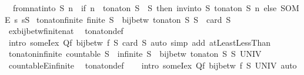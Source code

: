 \begin{isabellebody}
\ \ {\isachardoublequoteopen}from{\isacharunderscore}nat{\isacharunderscore}into\ S\ n\ {\isacharequal}\ {\isacharparenleft}if\ n\ {\isasymin}\ to{\isacharunderscore}nat{\isacharunderscore}on\ S\ {\isacharbackquote}\ S\ then\ inv{\isacharunderscore}into\ S\ {\isacharparenleft}to{\isacharunderscore}nat{\isacharunderscore}on\ S{\isacharparenright}\ n\ else\ SOME\ s{\isachardot}\ s{\isasymin}S{\isacharparenright}{\isachardoublequoteclose}\isanewline
\isanewline
{}\isamarkupfalse%
\ to{\isacharunderscore}nat{\isacharunderscore}on{\isacharunderscore}finite{\isacharcolon}\ {\isachardoublequoteopen}finite\ S\ {\isasymLongrightarrow}\ bij{\isacharunderscore}betw\ {\isacharparenleft}to{\isacharunderscore}nat{\isacharunderscore}on\ S{\isacharparenright}\ S\ {\isacharbraceleft}{\isachardot}{\isachardot}{\isacharless}\ card\ S{\isacharbraceright}{\isachardoublequoteclose}\isanewline
%
\isadelimproof
\ \ %
\endisadelimproof
%
\isatagproof
{}\isamarkupfalse%
\ ex{\isacharunderscore}bij{\isacharunderscore}betw{\isacharunderscore}finite{\isacharunderscore}nat\ \isamarkupfalse%
\ to{\isacharunderscore}nat{\isacharunderscore}on{\isacharunderscore}def\isanewline
\ \ \isamarkupfalse%
\ {\isacharparenleft}intro\ someI{}{\isacharunderscore}ex{\isacharbrackleft}\ Q{\isacharequal}{\isachardoublequoteopen}{\isasymlambda}f{\isachardot}\ bij{\isacharunderscore}betw\ f\ S\ {\isacharbraceleft}{\isachardot}{\isachardot}{\isacharless}card\ S{\isacharbraceright}{\isachardoublequoteclose}{\isacharbrackright}{\isacharparenright}\ {\isacharparenleft}auto\ simp\ add{\isacharcolon}\ atLeast{}LessThan{\isacharparenright}%
\endisatagproof
{\isafoldproof}%
%
\isadelimproof
\isanewline
%
\endisadelimproof
\isanewline
{}\isamarkupfalse%
\ to{\isacharunderscore}nat{\isacharunderscore}on{\isacharunderscore}infinite{\isacharcolon}\ {\isachardoublequoteopen}countable\ S\ {\isasymLongrightarrow}\ infinite\ S\ {\isasymLongrightarrow}\ bij{\isacharunderscore}betw\ {\isacharparenleft}to{\isacharunderscore}nat{\isacharunderscore}on\ S{\isacharparenright}\ S\ UNIV{\isachardoublequoteclose}\isanewline
%
\isadelimproof
\ \ %
\endisadelimproof
%
\isatagproof
{}\isamarkupfalse%
\ countableE{\isacharunderscore}infinite\ \isamarkupfalse%
\ to{\isacharunderscore}nat{\isacharunderscore}on{\isacharunderscore}def\isanewline
\ \ \isamarkupfalse%
\ {\isacharparenleft}intro\ someI{}{\isacharunderscore}ex{\isacharbrackleft}\ Q{\isacharequal}{\isachardoublequoteopen}{\isasymlambda}f{\isachardot}\ bij{\isacharunderscore}betw\ f\ S\ UNIV{\isachardoublequoteclose}{\isacharbrackright}{\isacharparenright}\ auto%

\end{isabellebody}
